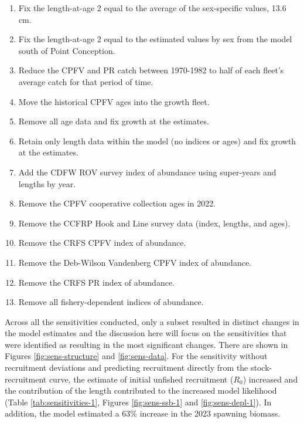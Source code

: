 \documentclass[11pt,
  letterpaper,
]{article}
\begin{document}
\begin{enumerate}

  \item Fix the length-at-age 2 equal to the average of the sex-specific values, 13.6 cm.
  
  \item Fix the length-at-age 2 equal to the estimated values by sex from the model south of Point Conception.
   
  \item Reduce the CPFV and PR catch between 1970-1982 to half of each fleet's average catch for that period of time.
  
  \item Move the historical CPFV ages into the growth fleet.
  
  \item Remove all age data and fix growth at the estimates.
  
  \item Retain only length data within the model (no indices or ages) and fix growth at the estimates.
  
  \item Add the CDFW ROV survey index of abundance using super-years and lengths by year.
  
  \item Remove the CPFV cooperative collection ages in 2022.
  
  \item Remove the CCFRP Hook and Line survey data (index, lengths, and ages).
  
  \item Remove the CRFS CPFV index of abundance.
  
  \item Remove the Deb-Wilson Vandenberg CPFV index of abundance.
  
  \item Remove the CRFS PR index of abundance.
  
  \item Remove all fishery-dependent indices of abundance.
  
\end{enumerate}

Across all the sensitivities conducted, only a subset resulted in distinct changes in the model estimates and the discussion here will focus on the sensitivities that were identified as resulting in the most significant changes. There are shown in Figures \ref{fig:sens-structure} and \ref{fig:sens-data}. For the sensitivity without recruitment deviations and predicting recruitment directly from the stock-recruitment curve, the estimate of initial unfished recruitment (\(R_0\)) increased and the contribution of the length contributed to the increased model likelihood (Table \ref{tab:sensitivities-1}, Figures \ref{fig:sens-ssb-1} and \ref{fig:sens-depl-1}). In addition, the model estimated a 63\% increase in the 2023 spawning biomass.
\end{document}
